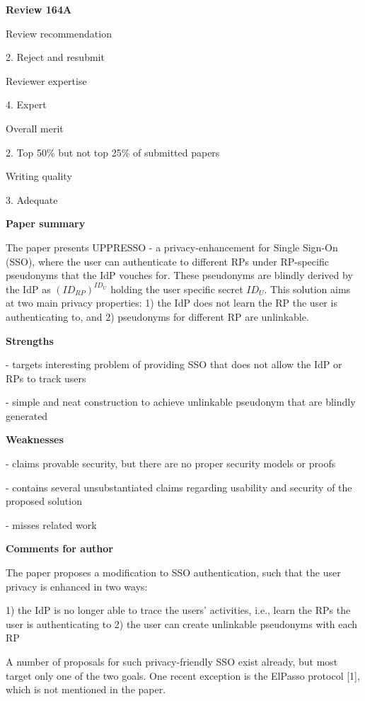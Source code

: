 \documentclass[letterpaper,onecolumn,10pt]{article}
\begin{document}
\vspace{1mm}\noindent\textbf{Review 164A}


Review recommendation


2. Reject and resubmit

Reviewer expertise


4. Expert

Overall merit


2. Top 50\% but not top 25\% of submitted papers

Writing quality


3. Adequate

\vspace{1mm}\noindent\textbf{Paper summary}


The paper presents UPPRESSO - a privacy-enhancement for Single Sign-On (SSO), where the user can authenticate to different RPs under RP-specific pseudonyms that the IdP vouches for. These pseudonyms are blindly derived by the IdP as $(ID_{RP})^{ID_U}$ holding the user specific secret $ID_U$. This solution aims at two main privacy properties: 1) the IdP does not learn the RP the user is authenticating to, and 2) pseudonyms for different RP are unlinkable.

\vspace{1mm}\noindent\textbf{Strengths}


- targets interesting problem of providing SSO that does not allow the IdP or RPs to track users

- simple and neat construction to achieve unlinkable pseudonym that are blindly generated

\vspace{1mm}\noindent\textbf{Weaknesses}


- claims provable security, but there are no proper security models or proofs

- contains several unsubstantiated claims regarding usability and security of the proposed solution

- misses related work

\vspace{1mm}\noindent\textbf{Comments for author}

The paper proposes a modification to SSO authentication, such that the user privacy is enhanced in two ways:

1) the IdP is no longer able to trace the users' activities, i.e., learn the RPs the user is authenticating to
2) the user can create unlinkable pseudonyms with each RP

A number of proposals for such privacy-friendly SSO exist already, but most target only one of the two goals. One recent exception is the ElPasso protocol [1], which is not mentioned in the paper.
\end{document}
